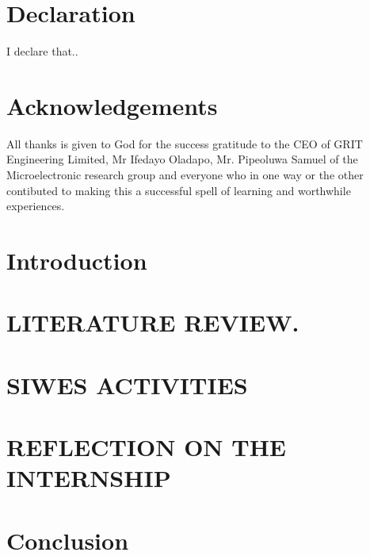 \documentclass[12pt,twoside]{report}
\begin{document}
\chapter*{Declaration}
I declare that..
 
\chapter*{Acknowledgements}
All thanks is given to God for the success gratitude to the CEO of GRIT Engineering Limited, Mr Ifedayo Oladapo, Mr. Pipeoluwa Samuel of the Microelectronic research group and everyone who in one way or the other contibuted to making this a successful spell of learning and worthwhile experiences.

 
\tableofcontents


\listoffigures

\chapter{Introduction}

 
\chapter{LITERATURE REVIEW.}

 
\chapter{SIWES ACTIVITIES}

 
\chapter{REFLECTION ON THE INTERNSHIP}

 
\chapter{Conclusion}

%
%
\end{document}
